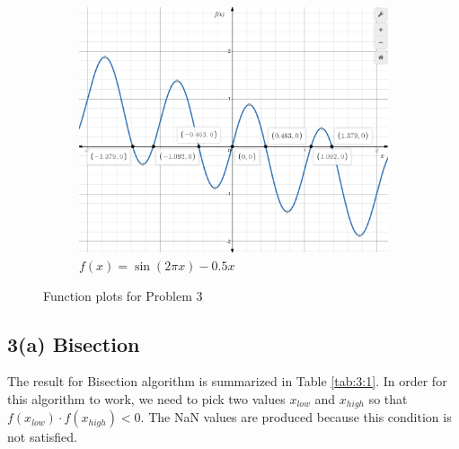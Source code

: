 \documentclass[11pt]{article}
\newcommand{\1}{\mathbbm{1}}
\begin{document}
\begin{figure}[htbp]
\begin{subfigure}[b]{0.48\textwidth}
		\includegraphics[width=\textwidth]{f3.png}
		\caption{$f(x)=\sin(2\pi x)-0.5x$}
		\label{3e}
	\end{subfigure}
	\caption{Function plots for Problem 3}
	\label{fig:3}
\end{figure}

\subsection*{3(a) Bisection}
The result for Bisection algorithm is summarized in Table \ref{tab:3:1}. In order for this algorithm to work, we need to pick two values $x_{low}$ and $x_{high}$ so that $f(x_{low})\cdot f(x_{high})<0$. The NaN values are produced because this condition is not satisfied.
\end{document}
